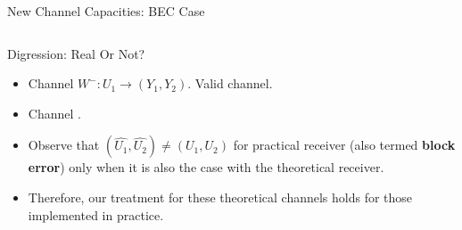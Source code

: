 \documentclass[8pt, compress]{beamer}
\begin{document}
\begin{frame}{New Channel Capacities: BEC Case}
\begin{columns}
\begin{column}{0.55\linewidth}
\begin{itemize}
            \end{itemize}
        \end{column}
    \end{columns}
    \vspace{6pt}
    \begin{flushleft}
    \end{flushleft}
    
\end{frame}

\begin{frame}{Digression: Real Or Not?}
    \begin{itemize}
        \item<1-> Channel $W^-: U_1 \to (Y_1, Y_2)$. Valid channel.
        \item<2-> Channel . 
    \end{itemize}
    \begin{itemize}
        \item<6-> Observe that $(\hat{U_1}, \hat{U_2}) \neq (U_1, U_2)$ for practical receiver (also termed \textbf{block error}) only when it is also the case with the theoretical receiver.
        \item<7-> Therefore, our treatment for these theoretical channels holds for those implemented in practice.
    \end{itemize}
\end{frame}
\end{document}
